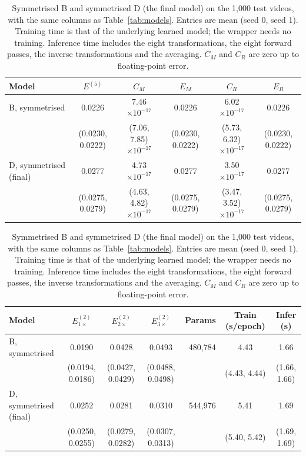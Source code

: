 \documentclass[11pt,letterpaper]{article}
\begin{document}
\begin{table}[htbp]
  \centering
  \footnotesize
  \setlength{\tabcolsep}{5pt}
\begin{tabular}{@{}l ccccc@{}}
  \toprule
  Model & $E^{(5)}$ & $C_M$ & $E_M$ & $C_R$ & $E_R$ \\
  \midrule
B, symmetrised & 0.0226 & 7.46$\times10^{-17}$ & 0.0226 & 6.02$\times10^{-17}$ & 0.0226 \\
 & \scriptsize(0.0230, 0.0222) & \scriptsize(7.06, 7.85)$\times10^{-17}$ & \scriptsize(0.0230, 0.0222) & \scriptsize(5.73, 6.32)$\times10^{-17}$ & \scriptsize(0.0230, 0.0222) \\
\addlinespace[2pt]
D, symmetrised (final) & 0.0277 & 4.73$\times10^{-17}$ & 0.0277 & 3.50$\times10^{-17}$ & 0.0277 \\
 & \scriptsize(0.0275, 0.0279) & \scriptsize(4.63, 4.82)$\times10^{-17}$ & \scriptsize(0.0275, 0.0279) & \scriptsize(3.47, 3.52)$\times10^{-17}$ & \scriptsize(0.0275, 0.0279) \\
  \bottomrule
\end{tabular}

\vspace{8pt}

\begin{tabular}{@{}l ccc rcc@{}}
  \toprule
  Model & $E^{(2)}_{1\times}$ & $E^{(2)}_{2\times}$ & $E^{(2)}_{3\times}$ & Params & Train (s/epoch) & Infer (s) \\
  \midrule
B, symmetrised & 0.0190 & 0.0428 & 0.0493 & 480{,}784 & 4.43 & 1.66 \\
 & \scriptsize(0.0194, 0.0186) & \scriptsize(0.0427, 0.0429) & \scriptsize(0.0488, 0.0498) &  & \scriptsize(4.43, 4.44) & \scriptsize(1.66, 1.66) \\
\addlinespace[2pt]
D, symmetrised (final) & 0.0252 & 0.0281 & 0.0310 & 544{,}976 & 5.41 & 1.69 \\
 & \scriptsize(0.0250, 0.0255) & \scriptsize(0.0279, 0.0282) & \scriptsize(0.0307, 0.0313) &  & \scriptsize(5.40, 5.42) & \scriptsize(1.69, 1.69) \\
  \bottomrule
\end{tabular}
  \caption{Symmetrised B and symmetrised D (the final model) on the 1,000 test videos, with the same columns as
  Table~\ref{tab:models}. Entries are mean (seed 0, seed 1). Training time is that of the underlying learned model;
  the wrapper needs no training. Inference time includes the eight transformations, the eight forward passes, the
  inverse transformations and the averaging. $C_M$ and $C_R$ are zero up to floating-point error.}
  \label{tab:sym}
\end{table}
\end{document}

